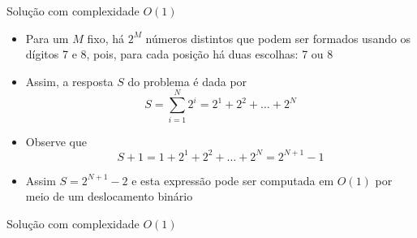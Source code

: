 \begin{frame}[fragile]{Solução com complexidade $O(1)$}

    \begin{itemize}
        \item Para um $M$ fixo, há $2^M$ números distintos que podem ser formados usando
            os dígitos 7 e 8, pois, para cada posição há duas escolhas: 7 ou 8

        \item Assim, a resposta $S$ do problema é dada por
        $$
            S = \sum_{i = 1}^N 2^i = 2^1 + 2^2 + \ldots + 2^N
        $$

        \item Observe que
        $$
            S + 1 = 1 + 2^1 + 2^2 + \ldots + 2^N = 2^{N + 1} - 1
        $$

        \item Assim $S = 2^{N + 1} - 2$ e esta expressão pode ser computada em $O(1)$ por meio
            de um deslocamento binário
    \end{itemize}

\end{frame}

\begin{frame}[fragile]{Solução com complexidade $O(1)$}
\end{frame}
